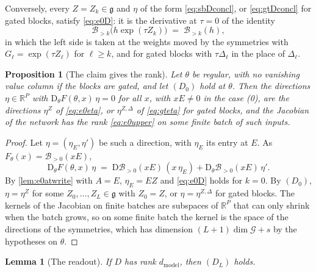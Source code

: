 \documentclass[10pt]{article}
\newtheorem{proposition}[theorem]{Proposition}
\newtheorem{lemma}[theorem]{Lemma}
\theoremstyle{definition}
\theoremstyle{remark}
\newcommand{\R}{\mathbb{R}}
\newcommand{\dm}{d_{\mathrm{model}}}
\newcommand{\Der}{\mathrm{D}}
\newcommand{\G}{\mathcal{G}}
\begin{document}
\smallskip
Conversely, every $Z = Z_k \in \mathfrak g$ and $\eta$ of the form \eqref{eq:sbDconcl}, or \eqref{eq:gtDconcl} for gated blocks, satisfy \eqref{eq:e0D}: it is the derivative at $\tau = 0$ of the identity
\[
\mathcal B_{>k}\big(h\exp(\tau Z_k)\big) \;=\; \mathcal B_{>k}(h),
\]
in which the left side is taken at the weights moved by the symmetries with $G_\ell = \exp(\tau Z_\ell)$ for $\ell \ge k$, and for gated blocks with $\tau\Delta_\ell$ in the place of $\Delta_\ell$.

\begin{proposition}[The claim gives the rank]\label{prop:e0givesrank}
Let $\theta$ be regular, with no vanishing value column if the blocks are gated, and let $(D_0)$ hold at $\theta$. Then the directions $\eta \in \R^P$ with $\Der_\theta F(\theta, x)\,\eta = 0$ for all $x$, with $xE \neq 0$ in the case (0), are the directions $\eta^{Z}$ of \eqref{eq:e0eta}, or $\eta^{Z,\Delta}$ of \eqref{eq:gteta} for gated blocks, and the Jacobian of the network has the rank \eqref{eq:e0upper} on some finite batch of such inputs.
\end{proposition}

\begin{proof}
Let $\eta = (\eta_E, \eta')$ be such a direction, with $\eta_E$ its entry at $E$. As $F_\theta(x) = \mathcal B_{>0}(xE)$,
\[
\Der_\theta F(\theta, x)\,\eta \;=\; \Der\mathcal B_{>0}(xE)\,(x\,\eta_E) + \Der_\theta\mathcal B_{>0}(xE)\,\eta' .
\]
By \cref{lem:e0atwrite} with $A = E$, $\eta_E = EZ$ and \eqref{eq:e0D} holds for $k = 0$. By $(D_0)$, $\eta = \eta^{Z}$ for some $Z_0, \dots, Z_L \in \mathfrak g$ with $Z_0 = Z$, or $\eta = \eta^{Z,\Delta}$ for gated blocks. The kernels of the Jacobian on finite batches are subspaces of $\R^P$ that can only shrink when the batch grows, so on some finite batch the kernel is the space of the directions of the symmetries, which has dimension $(L+1)\dim\G + s$ by the hypotheses on $\theta$.
\end{proof}

\begin{lemma}[The readout]\label{lem:e0readout}
If $D$ has rank $\dm$, then $(D_L)$ holds.
\end{lemma}
\end{document}
